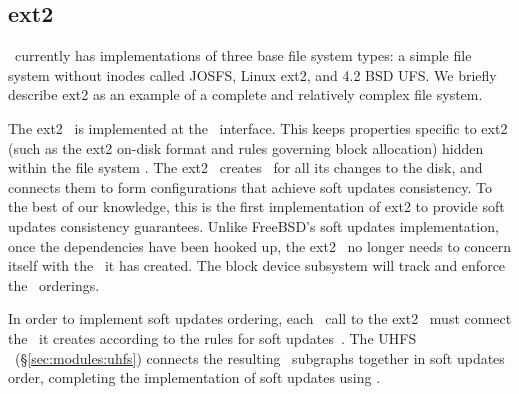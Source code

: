 \subsection{ext2}
\label{sec:using:ext2}

\Kudos\ currently has implementations of three base file system types: a simple
file system without inodes called JOSFS, Linux ext2, and 4.2 BSD UFS. We briefly
describe ext2 as an example of a complete and relatively complex file system.

The ext2 \module\ is implemented at the \LFS\ interface. This keeps properties
specific to ext2 (such as the ext2 on-disk format and rules governing block
allocation) hidden within the file system \module. The ext2 \module\ creates
\chdescs\ for all its changes to the disk, and connects them to form
configurations that achieve soft updates consistency. To the best of our
knowledge, this is the first implementation of ext2 to provide soft updates
consistency guarantees. Unlike FreeBSD's soft updates implementation, once the
dependencies have been hooked up, the ext2 \module\ no longer needs to concern
itself with the \chdescs\ it has created. The block device subsystem will track
and enforce the \chdesc\ orderings.

In order to implement soft updates ordering, each \LFS\ call to the ext2
\module\ must connect the \chdescs\ it creates according to the rules for soft
updates~\cite{ganger00soft}. The UHFS \module\ (\S\ref{sec:modules:uhfs})
connects the resulting \chdesc\ subgraphs together in soft updates order,
completing the implementation of soft updates using \chdescs.
